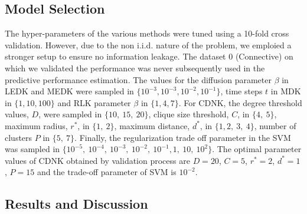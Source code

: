 \documentclass[review]{elsarticle}
\begin{document}
\subsection{Model Selection}
The hyper-parameters of the various methods were tuned using a 10-fold cross validation. However, due to the non i.i.d. nature of the problem, we emploied a stronger setup to ensure no information leakage. The dataset $0$ (Connective) on which we  validated the performance was never subsequently used in the predictive performance estimation. The values for the diffusion parameter $\beta$ in LEDK and MEDK were sampled in $\lbrace 10^{-3}, 10^{-3}, 10^{-2}, 10^{-1} \rbrace$, time steps $t$ in MDK in $\lbrace 1, 10, 100 \rbrace$ and RLK parameter $\beta$ in $\lbrace 1, 4, 7 \rbrace$. For CDNK, the degree threshold values, $D$, were sampled in $\lbrace 10,\ 15,\ 20 \rbrace$, clique size threshold, $C$, in $\lbrace 4,\ 5 \rbrace$, maximum radius, $r^*$, in $\lbrace 1,\ 2 \rbrace$, maximum distance, $d^*$, in $\lbrace 1, 2,\ 3,\ 4 \rbrace$, number of clusters $P$ in $\lbrace 5,\ 7 \rbrace$. Finally, the regularization trade off parameter in the SVM was sampled in $\lbrace 10^{-5},  \ 10^{-4}, \ 10^{-3},\ 10^{-2},\ 10^{-1}, 1,\ 10,\ 10^2 \rbrace$. The optimal parameter values of CDNK obtained by validation process are $D = 20$, $C=5$, $r^*=2$, $d^*=1$, $P=15$ and the trade-off parameter of SVM is $10^{-2}$.


\subsection{Results and Discussion}
\end{document}
